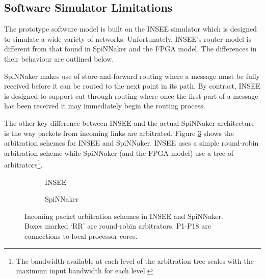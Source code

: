 		\subsection{Software Simulator Limitations}
		
			The prototype software model is built on the INSEE simulator
			\cite{navaridas11insee} which is designed to simulate a wide variety of
			networks. Unfortunately, INSEE's router model is different from that found
			in SpiNNaker and the FPGA model. The differences in their behaviour are
			outlined below.
			
			
			SpiNNaker makes use of store-and-forward routing where a message must be
			fully received before it can be routed to the next point in its path. By
			contrast, INSEE is designed to support cut-through routing where once the
			first part of a message has been received it may immediately begin the
			routing process.
			
			The other key difference between INSEE and the actual SpiNNaker
			architecture is the way packets from incoming links are arbitrated. Figure
			\ref{fig:arbitration} shows the arbitration schemes for INSEE and
			SpiNNaker. INSEE uses a simple round-robin arbitration scheme while
			SpiNNaker (and the FPGA model) use a tree of arbitrators\footnote{The
			bandwidth available at each level of the arbitration tree scales with the
			maximum input bandwidth for each level.}.
			
			\begin{figure}
				\begin{subfigure}[t]{0.50\textwidth}
					\center
					
					
					\caption{INSEE}
					\label{fig:arbitrationINSEE}
				\end{subfigure}
				\begin{subfigure}[t]{0.50\textwidth}
					\center
					
					
					\caption{SpiNNaker}
					\label{fig:arbitrationSpiNNaker}
				\end{subfigure}
				
				\caption[Incoming packet arbitration schemes in INSEE and
				SpiNNaker.]{Incoming packet arbitration schemes in INSEE and SpiNNaker.
				Boxes marked `RR' are round-robin arbitrators, P1-P18 are connections to
				local processor cores.}
				\label{fig:arbitration}
			\end{figure}
			
